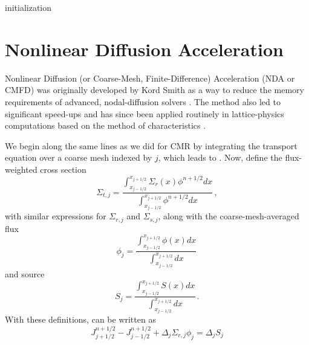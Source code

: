 \begin{algorithm}
 \label{alg:accel}
 \caption{Accelerated Source Iteration}
  initialization\;
\end{algorithm}



\section*{Nonlinear Diffusion Acceleration}

Nonlinear Diffusion (or Coarse-Mesh, Finite-Difference) Acceleration (NDA
or CMFD) was originally developed by Kord Smith as a way to reduce the 
memory requirements of advanced, nodal-diffusion solvers \cite{smith1983nms}.  
The method also
led to significant speed-ups and has since been applied routinely in
lattice-physics computations based on the method of characteristics
\cite{adams2002fim}.

We begin along the same lines as we did for CMR by integrating the 
transport equation over a coarse mesh indexed by $j$, which leads to 
.  Now, define the flux-weighted cross section
\begin{equation}
 \Sigma_{t,j} = \frac{\int^{x_{j+1/2}}_{x_{j-1/2}} \Sigma_r(x) \phi^{n+1/2} dx}
                     {\int^{x_{j+1/2}}_{x_{j-1/2}}\phi^{n+1/2} dx} \, ,
\end{equation}
with similar expressions for $\Sigma_{r,j}$ and $\Sigma_{s,j}$, along 
with the coarse-mesh-averaged flux
\begin{equation}
 \phi_{j} = \frac{\int^{x_{j+1/2}}_{x_{j-1/2}} \phi(x) dx}
              {\int^{x_{j+1/2}}_{x_{j-1/2}} dx} \, 
\end{equation}
and source
\begin{equation}
 S_{j} = \frac{\int^{x_{j+1/2}}_{x_{j-1/2}} S(x) dx}
              {\int^{x_{j+1/2}}_{x_{j-1/2}} dx} \, .
\end{equation} 
With these definitions,  can be written as
\begin{equation}
 J^{n+1/2}_{j+1/2} - J^{n+1/2}_{j-1/2} 
   + \Delta_j \Sigma_{r,j} \phi_j = \Delta_j S_j
\end{equation}

